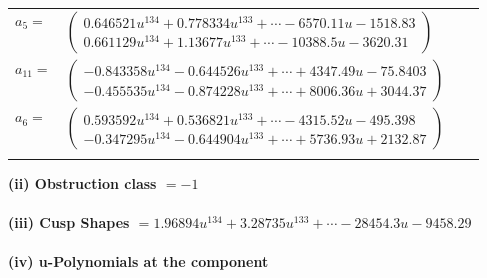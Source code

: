 \documentclass[1p]{elsarticle_modified}
\theoremstyle{definition}
\begin{document}
\begin{tabular}{m{7pt} m{180pt} m{7pt} m{180pt} }
\flushright $a_{5}=$&$\begin{pmatrix}0.646521 u^{134}+0.778334 u^{133}+\cdots-6570.11 u-1518.83\\0.661129 u^{134}+1.13677 u^{133}+\cdots-10388.5 u-3620.31\end{pmatrix}$ \\
\flushright $a_{11}=$&$\begin{pmatrix}-0.843358 u^{134}-0.644526 u^{133}+\cdots+4347.49 u-75.8403\\-0.455535 u^{134}-0.874228 u^{133}+\cdots+8006.36 u+3044.37\end{pmatrix}$ \\
\flushright $a_{6}=$&$\begin{pmatrix}0.593592 u^{134}+0.536821 u^{133}+\cdots-4315.52 u-495.398\\-0.347295 u^{134}-0.644904 u^{133}+\cdots+5736.93 u+2132.87\end{pmatrix}$\\&\end{tabular}
\flushleft \textbf{(ii) Obstruction class $= -1$}\\~\\
\flushleft \textbf{(iii) Cusp Shapes $= 1.96894 u^{134}+3.28735 u^{133}+\cdots-28454.3 u-9458.29$}\\~\\
\newpage\renewcommand{\arraystretch}{1}
\flushleft \textbf{(iv) u-Polynomials at the component}\newline \\
\end{document}
